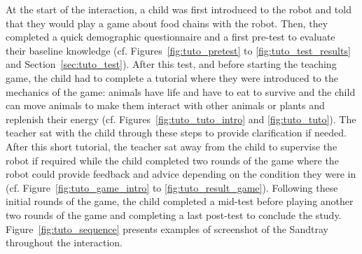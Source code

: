 At the start of the interaction, a child was first introduced to the robot and told that they would play a game about food chains with the robot. Then, they completed a quick demographic questionnaire and a first pre-test to evaluate their baseline knowledge (cf. Figures~\ref{fig:tuto_pretest} to \ref{fig:tuto_test_results} and Section~\ref{sec:tuto_test}). After this test, and before starting the teaching game, the child had to complete a tutorial where they were introduced to the mechanics of the game: animals have life and have to eat to survive and the child can move animals to make them interact with other animals or plants and replenish their energy (cf. Figures~\ref{fig:tuto_tuto_intro} and \ref{fig:tuto_tuto}). The teacher sat with the child through these steps to provide clarification if needed. After this short tutorial, the teacher sat away from the child to supervise the robot if required while the child completed two rounds of the game where the robot could provide feedback and advice depending on the condition they were in (cf. Figure~\ref{fig:tuto_game_intro} to \ref{fig:tuto_result_game}). Following these initial rounds of the game, the child completed a mid-test before playing another two rounds of the game and completing a last post-test to conclude the study. Figure~\ref{fig:tuto_sequence} presents examples of screenshot of the Sandtray throughout the interaction.


